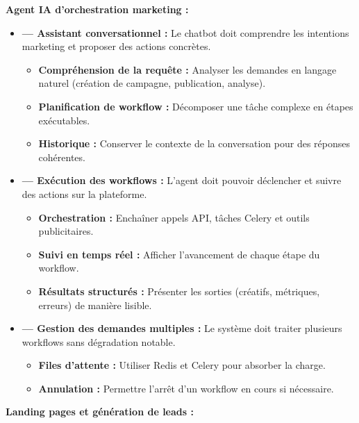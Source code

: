 \documentclass[12pt,a4paper]{report}
\numberwithin{figure}{chapter}
\numberwithin{table}{chapter}
\begin{document}
\textbf{Agent IA d’orchestration marketing :}

\begin{itemize}[leftmargin=2em,itemsep=6pt]
\item[] \textbf{--- Assistant conversationnel :} Le chatbot doit comprendre les intentions marketing et proposer des actions concrètes.
\begin{itemize}[label=$\checkmark$,leftmargin=2em,itemsep=3pt]
\item \textbf{Compréhension de la requête :} Analyser les demandes en langage naturel (création de campagne, publication, analyse).
\item \textbf{Planification de workflow :} Décomposer une tâche complexe en étapes exécutables.
\item \textbf{Historique :} Conserver le contexte de la conversation pour des réponses cohérentes.
\end{itemize}

\item[] \textbf{--- Exécution des workflows :} L’agent doit pouvoir déclencher et suivre des actions sur la plateforme.
\begin{itemize}[label=$\checkmark$,leftmargin=2em,itemsep=3pt]
\item \textbf{Orchestration :} Enchaîner appels API, tâches Celery et outils publicitaires.
\item \textbf{Suivi en temps réel :} Afficher l’avancement de chaque étape du workflow.
\item \textbf{Résultats structurés :} Présenter les sorties (créatifs, métriques, erreurs) de manière lisible.
\end{itemize}

\item[] \textbf{--- Gestion des demandes multiples :} Le système doit traiter plusieurs workflows sans dégradation notable.
\begin{itemize}[label=$\checkmark$,leftmargin=2em,itemsep=3pt]
\item \textbf{Files d’attente :} Utiliser Redis et Celery pour absorber la charge.
\item \textbf{Annulation :} Permettre l’arrêt d’un workflow en cours si nécessaire.
\end{itemize}
\end{itemize}

\textbf{Landing pages et génération de leads :}
\end{document}
